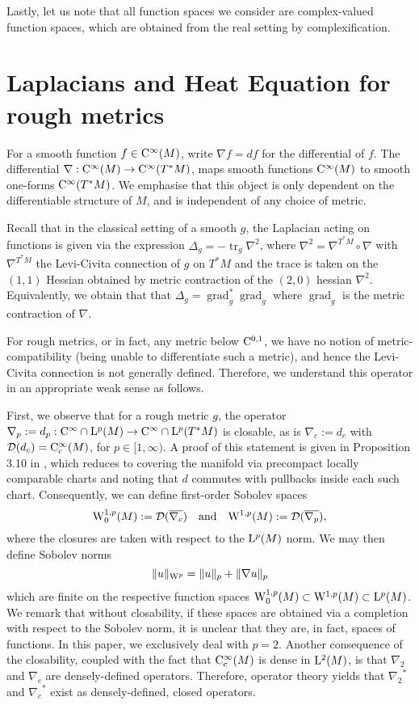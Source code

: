 \documentclass[AMS,STIX1COL]{WileyNJD-v2}
\numberwithin{equation}{section}
\renewcommand{\~}{\tilde}
\renewcommand{\-}{\bar}
\newcommand{\8}{\infty}
\DeclareMathOperator{\grad}{grad}
\newcommand{\dom}{ {\mathcal{D}}}
\newcommand{\comp}{\circ}
\DeclareMathOperator{\tr}{tr}			%
\newcommand{\adj}[1]{{#1}^\ast}			%
\newcommand{\Lp}[2][{}]{{\rm L}^{#2}_{\rm #1}}		%
\newcommand{\Ck}[2][{}]{{\rm C}^{#2}_{\rm #1}}		%
\newcommand{\Sob}[2][{}]{{\rm W}^{#2}_{\rm #1}}		%
\begin{document}
Lastly, let us note that all function spaces we consider are complex-valued function spaces, which are obtained from the real setting by complexification.


\section{Laplacians and Heat Equation for rough metrics}


For a smooth function \(f \in \Ck{\infty}(M)\), write \(\nabla f = df\) for the differential of \(f\). 
The differential \(\nabla : \Ck{\infty}(M) \to \Ck{\infty}(T^{\ast} M)\), maps smooth functions 
\(\Ck{\infty}(M)\) to smooth one-forms \(\Ck{\infty}(T^{\ast} M)\). 
We emphasise that this object is only dependent on the differentiable structure of $M$, and is independent of any choice of metric.

Recall that in the classical setting of a smooth $g$,  the Laplacian acting on functions is given  via the expression $\Delta_g = - \tr_g \nabla^2$, where $\nabla^2 = \nabla^{T^\ast M} \comp \nabla$
with $\nabla^{T^\ast M}$ the Levi-Civita connection of $g$ on \(T^{\ast} M\) and the trace is taken on the \((1,1)\) Hessian obtained by metric contraction of the \((2, 0)\) hessian \(\nabla^2\). Equivalently, we obtain that  that \(\Delta_g = \grad_g^\ast \grad_g\) where \(\grad_g\) is the metric contraction of \(\nabla\).

For rough metrics, or in fact, any metric below $\Ck{0,1}$, we have no notion of metric-compatibility (being unable to differentiate such a metric), and hence the Levi-Civita connection is not generally defined. Therefore, we understand this operator in an appropriate weak sense as follows. 

First, we observe that for a rough metric $g$, the operator
$\nabla_p := d_p: \Ck{\infty} \cap \Lp{p}(M) \to \Ck{\infty} \cap \Lp{p}(T^\ast M)$
is closable, as is $\nabla_c := d_c$ with $\dom(d_c) = \Ck[c]{\infty}(M)$,
for $p \in [1, \infty)$. A proof of this statement is given in Proposition 3.10 in \cite{BRough}, 
which reduces to covering the manifold via precompact locally comparable
charts and noting that $d$ commutes with pullbacks inside each such chart.
Consequently, we can define first-order Sobolev spaces
\[
\Sob[0]{1,p}(M) := \dom(\overline{\nabla_c})\quad \text{and}\quad  \Sob{1,p}(M) := \dom(\overline{\nabla_p}),
\]
where the closures are taken with respect to the \(\Lp{p}(M)\) norm. We may then define Sobolev norms
\[
\|u\|_{\Sob{p}} = \|u\|_p + \|\nabla u\|_p
\]
which are finite on the respective function spaces $\Sob[0]{1,p}(M) \subset \Sob{1,p}(M) \subset \Lp{p}(M)$. We remark that without closability, if these spaces are obtained via a completion with respect to the Sobolev norm, it is unclear that they are, in fact, spaces of functions. 
In this paper, we exclusively deal with \(p = 2\). 
Another consequence of the closability, coupled with the fact that $\Ck[c]{\infty}(M)$ is dense in $\Lp{2}(M)$, is that $\nabla_2$ and $\nabla_c$ are densely-defined operators. 
Therefore, operator theory yields 
that $\adj{\nabla_2}$ and $\adj{\nabla_c}$ exist
as densely-defined, closed operators.
\end{document}
